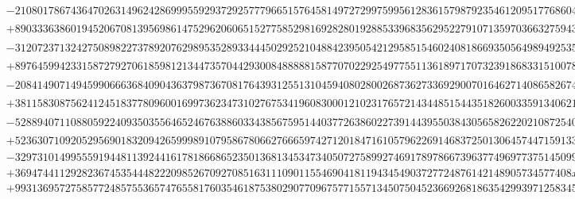 \documentclass[preprint,12pt,authoryear]{elsarticle}
\begin{document}
{\begin{align*}
  &-210801786743647026314962428699955929372925777966515764581497272997599561283615798792354612095177686041986524450961x_5^9\\
  &+89033363860194520670813956986147529620606515277585298169282801928853396835629522791071359703663275943842956580202x_5^8\\
  &-31207237132427508982273789207629895352893344450292521048842395054212958515460240818669350564989492535868999725081x_5^7\\
  &+8976459942331587279270618598121344735704429300848888815877070229254977551136189717073239186833151007865116037992x_5^6\\
  &-2084149071494599066636840904363798736708176439312551310459408028002687362733692900701646271408658267467743099101x_5^5\\
  &+381158308756241245183778096001699736234731027675341960830001210231765721434485154435182600335913406210638306866x_5^4\\
  &-52889407110880592240935035564652467638860334385675951440377263860227391443955038430565826220210872540006884446x_5^3\\
  &+5236307109205295690183209426599989107958678066276665974271201847161057962269146837250130645744715913371810412x_5^2\\
  &-329731014995559194481139244161781866865235013681345347340507275899274691789786673963774969773751450999559968x_5\\
  &+3694744112928236745354448222098526709270851631110901155469041811943454903727724876142148905734577408x_3\\
  &+9931369572758577248575536574765581760354618753802907709675771557134507504523669268186354299397125834523196,
\end{align*}
}
\end{document}
